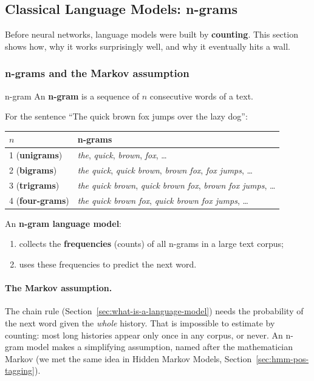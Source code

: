 \subsection{Classical Language Models: n-grams}
\label{sec:ngram-models}

Before neural networks, language models were built by \textbf{counting}. This section
shows how, why it works surprisingly well, and why it eventually hits a wall.

\subsubsection{n-grams and the Markov assumption}

\begin{nbdef}{n-gram}
An \textbf{n-gram} is a sequence of $n$ consecutive words of a text.
\end{nbdef}

For the sentence ``The quick brown fox jumps over the lazy dog'':
\begin{center}
\small
\begin{tabular}{@{}ll@{}}
\toprule
$n$ & n-grams \\
\midrule
1 (\textbf{unigrams})  & \emph{the}, \emph{quick}, \emph{brown}, \emph{fox}, \ldots \\
2 (\textbf{bigrams})   & \emph{the quick}, \emph{quick brown}, \emph{brown fox}, \emph{fox jumps}, \ldots \\
3 (\textbf{trigrams})  & \emph{the quick brown}, \emph{quick brown fox}, \emph{brown fox jumps}, \ldots \\
4 (\textbf{four-grams})& \emph{the quick brown fox}, \emph{quick brown fox jumps}, \ldots \\
\bottomrule
\end{tabular}
\end{center}

An \textbf{n-gram language model}:
\begin{enumerate}[nosep]
  \item collects the \textbf{frequencies} (counts) of all n-grams in a large text
        corpus;
  \item uses these frequencies to predict the next word.
\end{enumerate}

\paragraph{The Markov assumption.}
The chain rule (Section~\ref{sec:what-is-a-language-model}) needs the probability
of the next word given the
\emph{whole} history. That is impossible to estimate by counting: most long histories
appear only once in any corpus, or never. An n-gram model makes a simplifying
assumption, named after the mathematician Markov (we met the same idea in Hidden Markov
Models, Section~\ref{sec:hmm-pos-tagging}).

